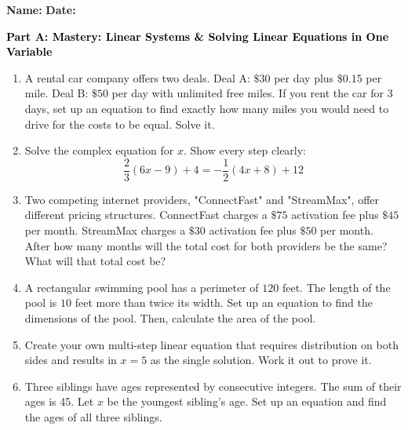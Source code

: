 \documentclass[12pt, letterpaper, fleqn]{article}
\begin{document}
\textbf{Name:} \underline{\hspace{5cm}}
\hfill
\textbf{Date:} \underline{\hspace{3cm}}\\

\begin{tcolorbox}[colback=customteal!20]
\large\textcolor{black}{\textbf{Part A: Mastery: Linear Systems \& Solving Linear Equations in One Variable}}
\end{tcolorbox}

\vspace{3mm}

\begin{enumerate}[itemsep=5.5cm, leftmargin=0.6cm]
\item A rental car company offers two deals. Deal A: $\$30$ per day plus $\$0.15$ per mile. Deal B: $\$50$ per day with unlimited free miles. If you rent the car for 3 days, set up an equation to find exactly how many miles you would need to drive for the costs to be equal. Solve it.
\vspace{3cm}
\item Solve the complex equation for $x$. Show every step clearly: 
$$ \frac{2}{3}(6x - 9) + 4 = -\frac{1}{2}(4x + 8) + 12 $$
\vspace{3cm}
\item Two competing internet providers, "ConnectFast" and "StreamMax", offer different pricing structures. ConnectFast charges a $\$75$ activation fee plus $\$45$ per month. StreamMax charges a $\$30$ activation fee plus $\$50$ per month. After how many months will the total cost for both providers be the same? What will that total cost be?
\vspace{3cm}
\item A rectangular swimming pool has a perimeter of $120$ feet. The length of the pool is $10$ feet more than twice its width. Set up an equation to find the dimensions of the pool. Then, calculate the area of the pool.
\vspace{3cm}
\item Create your own multi-step linear equation that requires distribution on both sides and results in $x = 5$ as the single solution. Work it out to prove it.
\vspace{4cm}
\item Three siblings have ages represented by consecutive integers. The sum of their ages is 45. Let $x$ be the youngest sibling's age. Set up an equation and find the ages of all three siblings.
\vspace{3cm}
\end{enumerate}
\end{document}
